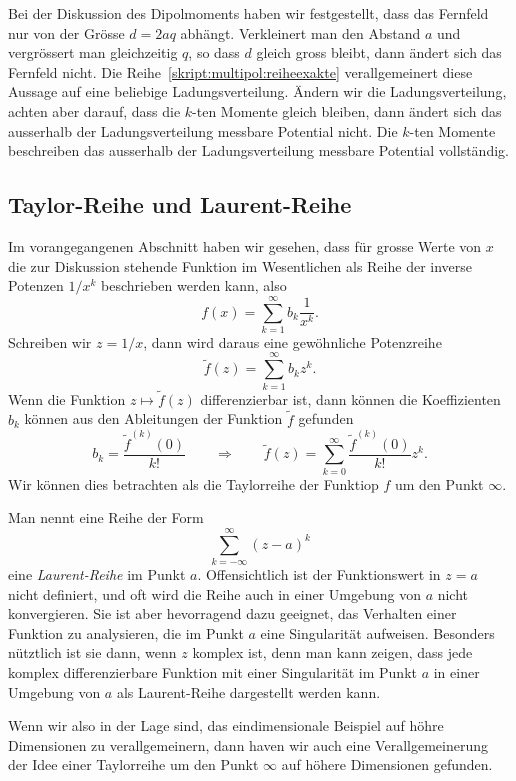 Bei der Diskussion des Dipolmoments haben wir festgestellt, dass das
Fernfeld nur von der Grösse $d=2aq$ abhängt.
Verkleinert man den Abstand $a$ und vergrössert man gleichzeitig $q$,
so dass $d$ gleich gross bleibt, dann ändert sich das Fernfeld nicht.
Die Reihe~\eqref{skript:multipol:reiheexakte} verallgemeinert diese
Aussage auf eine beliebige Ladungsverteilung.
Ändern wir die Ladungsverteilung, achten aber darauf, dass die
$k$-ten Momente gleich bleiben, dann ändert sich das ausserhalb der
Ladungsverteilung messbare Potential nicht.
Die $k$-ten Momente beschreiben das ausserhalb der Ladungsverteilung
messbare Potential vollständig.

\subsection{Taylor-Reihe und Laurent-Reihe}
Im vorangegangenen Abschnitt haben wir gesehen, dass für grosse Werte von
$x$ die zur Diskussion stehende Funktion im Wesentlichen als Reihe
der inverse Potenzen $1/x^k$ beschrieben werden kann, also
\[
f(x)=\sum_{k=1}^\infty b_k\frac1{x^k}.
\]
Schreiben wir $z=1/x$, dann wird daraus eine gewöhnliche Potenzreihe
\[
\tilde f(z)=\sum_{k=1}^\infty b_k z^k.
\]
Wenn die Funktion $z\mapsto \tilde f(z)$ differenzierbar ist, dann
können die Koeffizienten $b_k$ können aus den Ableitungen der Funktion
$\tilde f$ gefunden
\begin{equation}
b_k=\frac{\tilde f^{(k)}(0)}{k!}
\qquad\Rightarrow\qquad
\tilde f(z)
=
\sum_{k=0}^\infty \frac{\tilde f^{(k)}(0)}{k!}z^k.
\end{equation}
Wir können dies betrachten als die Taylorreihe der Funktiop $f$ um
den Punkt $\infty$.

Man nennt eine Reihe der Form
\[
\sum_{k=-\infty}^{\infty} (z-a)^k
\]
eine {\em Laurent-Reihe} im Punkt $a$.
Offensichtlich ist der Funktionswert in $z=a$ nicht definiert, und
oft wird die Reihe auch in einer Umgebung von $a$ nicht konvergieren.
Sie ist aber hevorragend dazu geeignet, das Verhalten einer Funktion
zu analysieren, die im Punkt $a$ eine Singularität aufweisen.
Besonders nütztlich ist sie dann, wenn $z$ komplex ist, denn man
kann zeigen, dass jede komplex differenzierbare Funktion mit einer
Singularität im Punkt $a$ in einer Umgebung von $a$ als Laurent-Reihe
dargestellt werden kann.

Wenn wir also in der Lage sind, das eindimensionale Beispiel auf höhre
Dimensionen zu verallgemeinern, dann haven wir auch eine Verallgemeinerung
der Idee einer Taylorreihe um den Punkt $\infty$ auf höhere Dimensionen
gefunden.








